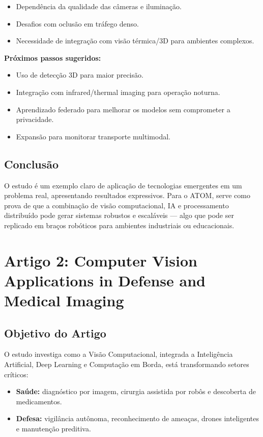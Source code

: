\documentclass{article}
\begin{document}
\begin{itemize}
    \item Dependência da qualidade das câmeras e iluminação.
    \item Desafios com oclusão em tráfego denso.
    \item Necessidade de integração com visão térmica/3D para ambientes complexos.
\end{itemize}

\textbf{Próximos passos sugeridos:}
\begin{itemize}
    \item Uso de detecção 3D para maior precisão.
    \item Integração com infrared/thermal imaging para operação noturna.
    \item Aprendizado federado para melhorar os modelos sem comprometer a privacidade.
    \item Expansão para monitorar transporte multimodal.
\end{itemize}

\subsection*{Conclusão}

O estudo é um exemplo claro de aplicação de tecnologias emergentes em um problema real, apresentando resultados expressivos. Para o ATOM, serve como prova de que a combinação de visão computacional, IA e processamento distribuído pode gerar sistemas robustos e escaláveis --- algo que pode ser replicado em braços robóticos para ambientes industriais ou educacionais.

\bigskip

\section*{Artigo 2: Computer Vision Applications in Defense and Medical Imaging}

\subsection*{Objetivo do Artigo}

O estudo investiga como a Visão Computacional, integrada a Inteligência Artificial, Deep Learning e Computação em Borda, está transformando setores críticos:

\begin{itemize}
    \item \textbf{Saúde:} diagnóstico por imagem, cirurgia assistida por robôs e descoberta de medicamentos.
    \item \textbf{Defesa:} vigilância autônoma, reconhecimento de ameaças, drones inteligentes e manutenção preditiva.
\end{itemize}
\end{document}
